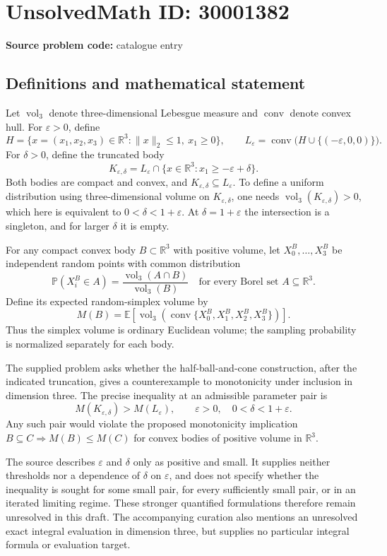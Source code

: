 \documentclass[11pt]{article}
\newcommand{\R}{\mathbb{R}}
\newcommand{\E}{\mathbb{E}}
\begin{document}
\section*{UnsolvedMath ID: 30001382}
\textbf{Source problem code:} catalogue entry
\subsection{Definitions and mathematical statement}
Let \(\operatorname{vol}_3\) denote three-dimensional Lebesgue measure and \(\operatorname{conv}\) denote convex hull. For \(\varepsilon>0\), define
\[
H=\{x=(x_1,x_2,x_3)\in\R^3:\|x\|_2\leq1,\ x_1\geq0\},\qquad
L_\varepsilon=\operatorname{conv}\bigl(H\cup\{(-\varepsilon,0,0)\}\bigr).
\]
For \(\delta>0\), define the truncated body
\[
K_{\varepsilon,\delta}=L_\varepsilon\cap\{x\in\R^3:x_1\geq-\varepsilon+\delta\}.
\]
Both bodies are compact and convex, and \(K_{\varepsilon,\delta}\subseteq L_\varepsilon\). To define a uniform distribution using three-dimensional volume on \(K_{\varepsilon,\delta}\), one needs \(\operatorname{vol}_3(K_{\varepsilon,\delta})>0\), which here is equivalent to \(0<\delta<1+\varepsilon\). At \(\delta=1+\varepsilon\) the intersection is a singleton, and for larger \(\delta\) it is empty.

For any compact convex body \(B\subset\R^3\) with positive volume, let \(X_0^B,\ldots,X_3^B\) be independent random points with common distribution
\[
\mathbb{P}(X_i^B\in A)=\frac{\operatorname{vol}_3(A\cap B)}{\operatorname{vol}_3(B)}
\quad\text{for every Borel set }A\subseteq\R^3.
\]
Define its expected random-simplex volume by
\[
M(B)=\E\!\left[\operatorname{vol}_3\!\left(\operatorname{conv}\{X_0^B,X_1^B,X_2^B,X_3^B\}\right)\right].
\]
Thus the simplex volume is ordinary Euclidean volume; the sampling probability is normalized separately for each body.

The supplied problem asks whether the half-ball-and-cone construction, after the indicated truncation, gives a counterexample to monotonicity under inclusion in dimension three. The precise inequality at an admissible parameter pair is
\[
M(K_{\varepsilon,\delta})>M(L_\varepsilon),
\qquad \varepsilon>0,\quad 0<\delta<1+\varepsilon.
\]
Any such pair would violate the proposed monotonicity implication \(B\subseteq C\Longrightarrow M(B)\leq M(C)\) for convex bodies of positive volume in \(\R^3\).

The source describes \(\varepsilon\) and \(\delta\) only as positive and small. It supplies neither thresholds nor a dependence of \(\delta\) on \(\varepsilon\), and does not specify whether the inequality is sought for some small pair, for every sufficiently small pair, or in an iterated limiting regime. These stronger quantified formulations therefore remain unresolved in this draft. The accompanying curation also mentions an unresolved exact integral evaluation in dimension three, but supplies no particular integral formula or evaluation target.
\end{document}
